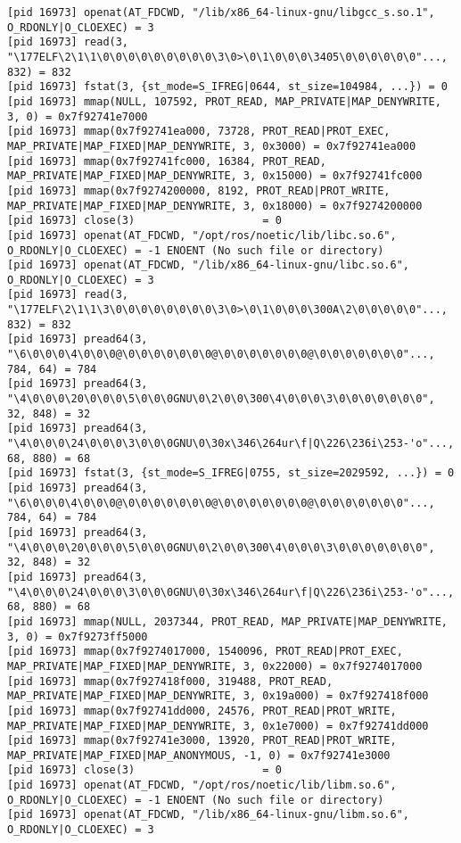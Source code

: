 \documentclass[a4paper, 12pt]{article}
\begin{document}
\begin{lstlisting}
[pid 16973] openat(AT_FDCWD, "/lib/x86_64-linux-gnu/libgcc_s.so.1", O_RDONLY|O_CLOEXEC) = 3
[pid 16973] read(3, "\177ELF\2\1\1\0\0\0\0\0\0\0\0\0\3\0>\0\1\0\0\0\3405\0\0\0\0\0\0"..., 832) = 832
[pid 16973] fstat(3, {st_mode=S_IFREG|0644, st_size=104984, ...}) = 0
[pid 16973] mmap(NULL, 107592, PROT_READ, MAP_PRIVATE|MAP_DENYWRITE, 3, 0) = 0x7f92741e7000
[pid 16973] mmap(0x7f92741ea000, 73728, PROT_READ|PROT_EXEC, MAP_PRIVATE|MAP_FIXED|MAP_DENYWRITE, 3, 0x3000) = 0x7f92741ea000
[pid 16973] mmap(0x7f92741fc000, 16384, PROT_READ, MAP_PRIVATE|MAP_FIXED|MAP_DENYWRITE, 3, 0x15000) = 0x7f92741fc000
[pid 16973] mmap(0x7f9274200000, 8192, PROT_READ|PROT_WRITE, MAP_PRIVATE|MAP_FIXED|MAP_DENYWRITE, 3, 0x18000) = 0x7f9274200000
[pid 16973] close(3)                    = 0
[pid 16973] openat(AT_FDCWD, "/opt/ros/noetic/lib/libc.so.6", O_RDONLY|O_CLOEXEC) = -1 ENOENT (No such file or directory)
[pid 16973] openat(AT_FDCWD, "/lib/x86_64-linux-gnu/libc.so.6", O_RDONLY|O_CLOEXEC) = 3
[pid 16973] read(3, "\177ELF\2\1\1\3\0\0\0\0\0\0\0\0\3\0>\0\1\0\0\0\300A\2\0\0\0\0\0"..., 832) = 832
[pid 16973] pread64(3, "\6\0\0\0\4\0\0\0@\0\0\0\0\0\0\0@\0\0\0\0\0\0\0@\0\0\0\0\0\0\0"..., 784, 64) = 784
[pid 16973] pread64(3, "\4\0\0\0\20\0\0\0\5\0\0\0GNU\0\2\0\0\300\4\0\0\0\3\0\0\0\0\0\0\0", 32, 848) = 32
[pid 16973] pread64(3, "\4\0\0\0\24\0\0\0\3\0\0\0GNU\0\30x\346\264ur\f|Q\226\236i\253-'o"..., 68, 880) = 68
[pid 16973] fstat(3, {st_mode=S_IFREG|0755, st_size=2029592, ...}) = 0
[pid 16973] pread64(3, "\6\0\0\0\4\0\0\0@\0\0\0\0\0\0\0@\0\0\0\0\0\0\0@\0\0\0\0\0\0\0"..., 784, 64) = 784
[pid 16973] pread64(3, "\4\0\0\0\20\0\0\0\5\0\0\0GNU\0\2\0\0\300\4\0\0\0\3\0\0\0\0\0\0\0", 32, 848) = 32
[pid 16973] pread64(3, "\4\0\0\0\24\0\0\0\3\0\0\0GNU\0\30x\346\264ur\f|Q\226\236i\253-'o"..., 68, 880) = 68
[pid 16973] mmap(NULL, 2037344, PROT_READ, MAP_PRIVATE|MAP_DENYWRITE, 3, 0) = 0x7f9273ff5000
[pid 16973] mmap(0x7f9274017000, 1540096, PROT_READ|PROT_EXEC, MAP_PRIVATE|MAP_FIXED|MAP_DENYWRITE, 3, 0x22000) = 0x7f9274017000
[pid 16973] mmap(0x7f927418f000, 319488, PROT_READ, MAP_PRIVATE|MAP_FIXED|MAP_DENYWRITE, 3, 0x19a000) = 0x7f927418f000
[pid 16973] mmap(0x7f92741dd000, 24576, PROT_READ|PROT_WRITE, MAP_PRIVATE|MAP_FIXED|MAP_DENYWRITE, 3, 0x1e7000) = 0x7f92741dd000
[pid 16973] mmap(0x7f92741e3000, 13920, PROT_READ|PROT_WRITE, MAP_PRIVATE|MAP_FIXED|MAP_ANONYMOUS, -1, 0) = 0x7f92741e3000
[pid 16973] close(3)                    = 0
[pid 16973] openat(AT_FDCWD, "/opt/ros/noetic/lib/libm.so.6", O_RDONLY|O_CLOEXEC) = -1 ENOENT (No such file or directory)
[pid 16973] openat(AT_FDCWD, "/lib/x86_64-linux-gnu/libm.so.6", O_RDONLY|O_CLOEXEC) = 3

\end{lstlisting}
\end{document}
